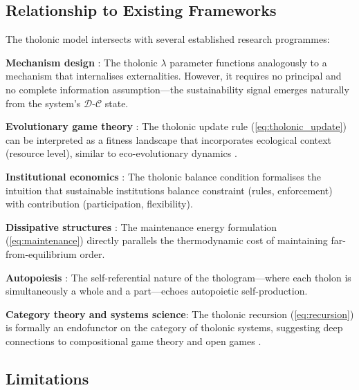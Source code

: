 \documentclass[12pt,a4paper,twocolumn]{article}
\newcommand{\D}{\mathcal{D}}
\newcommand{\CC}{\mathcal{C}}
\begin{document}
\subsection{Relationship to Existing Frameworks}

The tholonic model intersects with several established research programmes:

\textbf{Mechanism design} \citep{Myerson1981,Hurwicz2006}: The tholonic $\lambda$ parameter functions analogously to a mechanism that internalises externalities.
However, it requires no principal and no complete information assumption---the sustainability signal emerges naturally from the system's $\D$-$\CC$ state.

\textbf{Evolutionary game theory} \citep{MaynardSmith1982,Nowak2006}: The tholonic update rule (\cref{eq:tholonic_update}) can be interpreted as a fitness landscape that incorporates ecological context (resource level), similar to eco-evolutionary dynamics \citep{Pelletier2009}.

\textbf{Institutional economics} \citep{North1990,Ostrom2005}: The tholonic balance condition formalises the intuition that sustainable institutions balance constraint (rules, enforcement) with contribution (participation, flexibility).

\textbf{Dissipative structures} \citep{Prigogine1984}: The maintenance energy formulation (\cref{eq:maintenance}) directly parallels the thermodynamic cost of maintaining far-from-equilibrium order.

\textbf{Autopoiesis} \citep{Maturana1980}: The self-referential nature of the thologram---where each tholon is simultaneously a whole and a part---echoes autopoietic self-production.

\textbf{Category theory and systems science}: The tholonic recursion (\cref{eq:recursion}) is formally an endofunctor on the category of tholonic systems, suggesting deep connections to compositional game theory \citep{Ghani2018} and open games \citep{Hedges2018}.

\subsection{Limitations}
\end{document}
